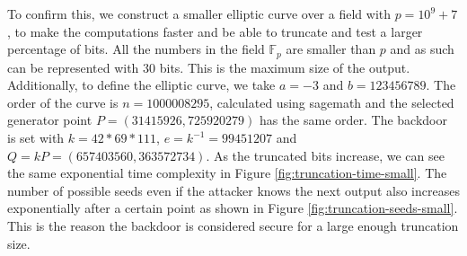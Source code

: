 To confirm this, we construct a smaller elliptic curve over a field with $p = 10^9 + 7$, to make the computations faster and be able to truncate and test a larger percentage of bits. All the numbers in the field $\mathbb{F}_p$ are smaller than $p$ and as such can be represented with $30$ bits. This is the maximum size of the output.
Additionally, to define the elliptic curve, we take $a = -3$ and $b = 123456789$. The order of the curve is $n = 1000008295$, calculated using sagemath \cite{sagemath} and the selected generator point $P = (31415926, 725920279)$ has the same order. The backdoor is set with $k = 42 * 69 * 111$, $e = k^{-1} = 99451207$ and $Q = kP = (657403560, 363572734)$. As the truncated bits increase, we can see the same exponential time complexity in Figure \ref{fig:truncation-time-small}. The number of possible seeds even if the attacker knows the next output also increases exponentially after a certain point as shown in Figure \ref{fig:truncation-seeds-small}. This is the reason the backdoor is considered secure for a large enough truncation size.

